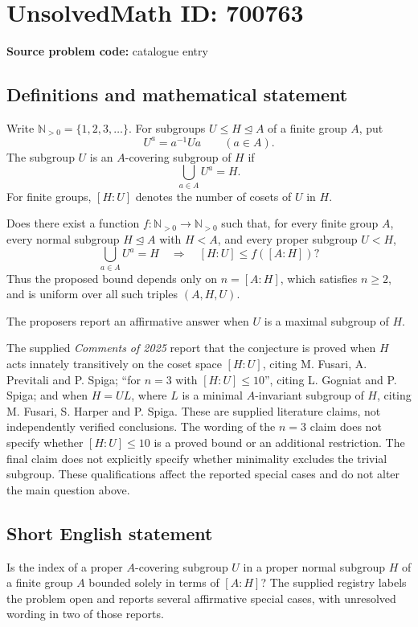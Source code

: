 \documentclass[11pt]{article}
\newcommand{\N}{\mathbb{N}}
\begin{document}
\section*{UnsolvedMath ID: 700763}
\textbf{Source problem code:} catalogue entry
\subsection{Definitions and mathematical statement}
Write \(\N_{>0}=\{1,2,3,\ldots\}\). For subgroups \(U\leq H\trianglelefteq A\) of a finite group \(A\), put
\[
U^a=a^{-1}Ua\qquad(a\in A).
\]
The subgroup \(U\) is an \(A\)-covering subgroup of \(H\) if
\[
\bigcup_{a\in A}U^a=H.
\]
For finite groups, \([H:U]\) denotes the number of cosets of \(U\) in \(H\).

Does there exist a function \(f:\N_{>0}\to\N_{>0}\) such that, for every finite group \(A\), every normal subgroup \(H\trianglelefteq A\) with \(H<A\), and every proper subgroup \(U<H\),
\[
\bigcup_{a\in A}U^a=H
\quad\Longrightarrow\quad
[H:U]\leq f([A:H])?
\]
Thus the proposed bound depends only on \(n=[A:H]\), which satisfies \(n\geq2\), and is uniform over all such triples \((A,H,U)\).

The proposers report an affirmative answer when \(U\) is a maximal subgroup of \(H\).

The supplied \emph{Comments of 2025} report that the conjecture is proved when \(H\) acts innately transitively on the coset space \([H:U]\), citing M. Fusari, A. Previtali and P. Spiga; ``for \(n=3\) with \([H:U]\leq10\)'', citing L. Gogniat and P. Spiga; and when \(H=UL\), where \(L\) is a minimal \(A\)-invariant subgroup of \(H\), citing M. Fusari, S. Harper and P. Spiga. These are supplied literature claims, not independently verified conclusions. The wording of the \(n=3\) claim does not specify whether \([H:U]\leq10\) is a proved bound or an additional restriction. The final claim does not explicitly specify whether minimality excludes the trivial subgroup. These qualifications affect the reported special cases and do not alter the main question above.
\subsection{Short English statement}
Is the index of a proper \(A\)-covering subgroup \(U\) in a proper normal subgroup \(H\) of a finite group \(A\) bounded solely in terms of \([A:H]\)? The supplied registry labels the problem open and reports several affirmative special cases, with unresolved wording in two of those reports.
\end{document}

